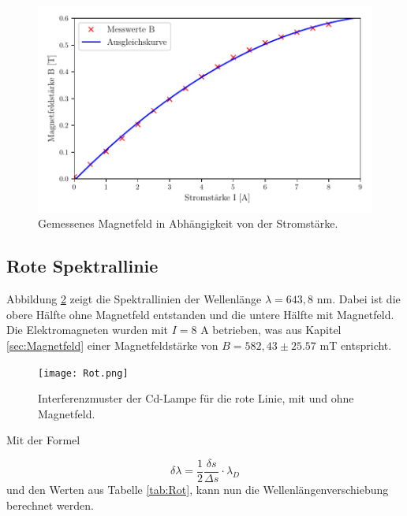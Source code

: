 \begin{figure}[H]
  \centering
  \includegraphics[scale=0.65]{Magnetfeld.pdf}
  \vspace{-10pt}
  \caption{Gemessenes Magnetfeld in Abhängigkeit von der Stromstärke.}
  \label{fig:Magnetfeld}
\end{figure}


\subsection{Rote Spektrallinie}
Abbildung \ref{fig:rot} zeigt die Spektrallinien der Wellenlänge $\lambda = 643,8$ nm. Dabei ist die obere Hälfte ohne Magnetfeld 
entstanden und die untere Hälfte mit Magnetfeld. Die Elektromagneten wurden mit $I = 8$ A betrieben, was aus Kapitel \ref{sec:Magnetfeld} 
einer Magnetfeldstärke von $B = 582,43 \pm 25.57$ mT entspricht.

\begin{figure}[H]
  \centering
  \texttt{[image: Rot.png]}
  \vspace{-10pt}
  \caption{Interferenzmuster der Cd-Lampe für die rote Linie, mit und ohne Magnetfeld.}
  \label{fig:rot}
\end{figure}
Mit der Formel 

\begin{equation}
  \label{equ:Wellenlänge}
  \delta \lambda = \frac{1}{2} \frac{\delta s}{\Delta s} \cdot \lambda_D
\end{equation}
und den Werten aus Tabelle \ref{tab:Rot}, kann nun die Wellenlängenverschiebung berechnet werden.


